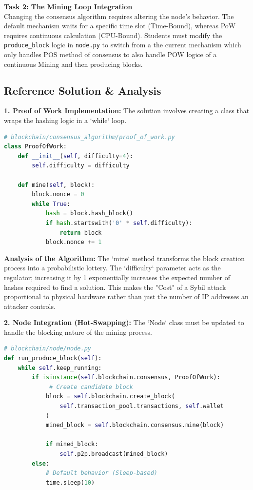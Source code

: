 \textbf{Task 2: The Mining Loop Integration} \\
Changing the consensus algorithm requires altering the node's behavior. The default mechanism waits for a specific time slot (Time-Bound), whereas PoW requires continuous calculation (CPU-Bound). Students must modify the \texttt{produce\_block} logic in \texttt{node.py} to switch from a the current mechanism which only handles POS method of consensus to also handle POW logice of a continuous Mining and then producing blocks.

\subsection{Reference Solution \& Analysis}

\textbf{1. Proof of Work Implementation:}
The solution involves creating a class that wraps the hashing logic in a `while` loop.

\begin{lstlisting}[language=Python, caption=Proof of Work Mining Logic, label=lst:mod2_pow_class]
# blockchain/consensus_algorithm/proof_of_work.py
class ProofOfWork:
    def __init__(self, difficulty=4):
        self.difficulty = difficulty

    def mine(self, block):
        block.nonce = 0
        while True:
            hash = block.hash_block()
            if hash.startswith('0' * self.difficulty):
                return block
            block.nonce += 1
\end{lstlisting}

\textbf{Analysis of the Algorithm:}
The `mine` method transforms the block creation process into a probabilistic lottery. The `difficulty` parameter acts as the regulator; increasing it by 1 exponentially increases the expected number of hashes required to find a solution. This makes the "Cost" of a Sybil attack proportional to physical hardware rather than just the number of IP addresses an attacker controls.

\textbf{2. Node Integration (Hot-Swapping):}
The `Node` class must be updated to handle the blocking nature of the mining process.

\begin{lstlisting}[language=Python, caption=Integrating the Mining Loop, label=lst:mod2_node_integration]
# blockchain/node/node.py
def run_produce_block(self):
    while self.keep_running:
        if isinstance(self.blockchain.consensus, ProofOfWork):
             # Create candidate block
            block = self.blockchain.create_block(
                self.transaction_pool.transactions, self.wallet
            )
            mined_block = self.blockchain.consensus.mine(block)
            
            if mined_block:
                self.p2p.broadcast(mined_block)
        else:
            # Default behavior (Sleep-based)
            time.sleep(10)
\end{lstlisting}

